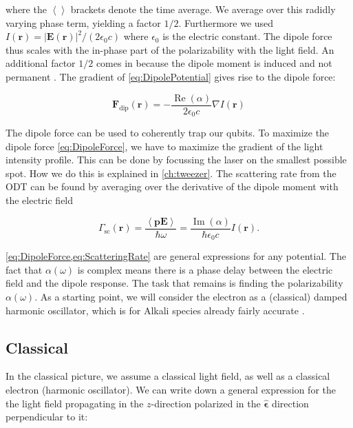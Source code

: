 where the $\left\langle\right\rangle$ brackets denote the time average.
We average over this radidly varying phase term, yielding a factor $1/2$.
Furthermore we used $I(\mathbf{r}) = |\mathbf{E}(\mathbf{r})|^2/(2\epsilon_0 c)$ where $\epsilon_0$ is the electric constant. 
The dipole force thus scales with the in-phase part of the polarizability with the light field. 
An additional factor $1/2$ comes in because the dipole moment is induced and not permanent \cite{Grimm2000}. 
The gradient of \cref{eq:DipolePotential} gives rise to the dipole force:

\begin{equation}\label{eq:DipoleForce}
	\mathbf{F}_{\text{dip}}(\mathbf{r}) = - \frac{\operatorname{Re}(\alpha)}{2\epsilon_0c}\nabla I(\mathbf{r})
\end{equation}

The dipole force can be used to coherently trap our qubits. 
To maximize the dipole force \cref{eq:DipoleForce}, 
we have to maximize the gradient of the light intensity profile.
This can be done by focussing the laser on the smallest possible spot.
How we do this is explained in \cref{ch:tweezer}. 
The scattering rate from the ODT can be found by averaging over the derivative of the dipole moment with the electric field \cite{Grimm2000}

\begin{equation}\label{eq:ScatteringRate}
	\Gamma_{\text{sc}}(\mathbf{r}) = \frac{\left\langle \mathbf{p} \mathbf{E} \right\rangle}{\hbar \omega}
	 = \frac{\operatorname{Im}(\alpha)}{\hbar \epsilon_0 c} I(\mathbf{r}).
\end{equation}

\cref{eq:DipoleForce,eq:ScatteringRate} are general expressions for any potential. The fact that $\alpha(\omega)$ is complex means there is a phase delay between the electric field and the dipole response.
The task that remains is finding the polarizability $\alpha(\omega)$. 
As a starting point, we will consider the electron as a (classical) damped harmonic oscillator, which is for Alkali species already fairly accurate \cite{Grimm2000}.

\subsection{Classical}

In the classical picture, we assume a classical light field, as well as a classical electron (harmonic oscillator). 
We can write down a general expression for the the light field propagating in the $z$-direction polarized in the $\bm{\hat{\epsilon}}$ direction perpendicular to it:

